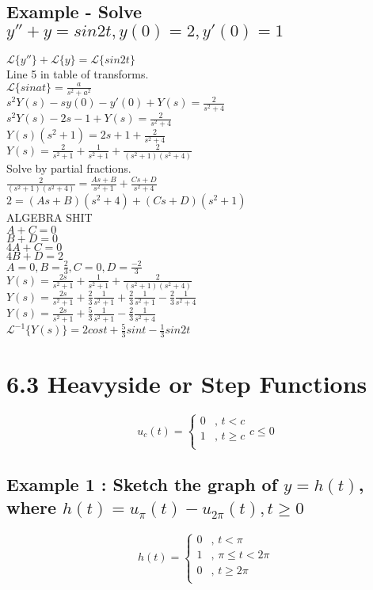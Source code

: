 \documentclass[12pt, letterpaper, twoside]{article}
\newcommand{\laplace}{\mathcal{L}}
\begin{document}
\subsection*{Example - Solve $y''+y=sin2t, y(0)=2, y'(0)=1$}
$\laplace\{y''\}+\laplace\{y\}=\laplace\{sin2t\}$\\
Line 5 in table of transforms.\\
$\laplace\{sinat\}=\frac{a}{s^2+a^2}$\\
$s^2Y(s)-sy(0)-y'(0)+Y(s)=\frac{2}{s^2+4}$\\
$s^2Y(s)-2s-1+Y(s)=\frac{2}{s^2+4}$\\
$Y(s)(s^2+1)=2s+1+\frac{2}{s^2+4}$\\
$Y(s)=\frac{2}{s^2+1}+\frac{1}{s^2+1}+\frac{2}{(s^2+1)(s^2+4)}$\\
Solve by partial fractions.\\
$\frac{2}{(s^2+1)(s^2+4)}=\frac{As+B}{s^2+1}+\frac{Cs+D}{s^2+4}$\\
$2=(As+B)(s^2+4)+(Cs+D)(s^2+1)$\\
ALGEBRA SHIT\\
$A+C=0$\\
$B+D=0$\\
$4A+C=0$\\
$4B+D=2$\\
$A=0, B=\frac{2}{3}, C=0, D=\frac{-2}{3}$\\
$Y(s)=\frac{2s}{s^2+1}+\frac{1}{s^2+1}+\frac{2}{(s^2+1)(s^2+4)}$\\
$Y(s)=\frac{2s}{s^2+1}+\frac{2}{3}\frac{1}{s^2+1}+\frac{2}{3}\frac{1}{s^2+1}-\frac{2}{3}\frac{1}{s^2+4}$\\
$Y(s)=\frac{2s}{s^2+1}+\frac{5}{3}\frac{1}{s^2+1}-\frac{2}{3}\frac{1}{s^2+4}$\\
$\laplace^{-1}\{Y(s)\}=2cost+\frac{5}{3}sint-\frac{1}{3}sin2t$\\

\section*{6.3 Heavyside or Step Functions}
\[
  u_c(t) =
  \begin{cases}
  	0 & \text{, $t < c$} \\
  	1 & \text{, $t \geq c$} \\
  \end{cases}
  c \leq 0
\]

\subsection*{Example 1 : Sketch the graph of $y=h(t)$, where $h(t)=u_\pi(t)-u_{2\pi}(t), t \geq 0$}
\[
  h(t) =
  \begin{cases}
  	0 & \text{, $t < \pi$} \\
  	1 & \text{, $\pi \leq t < 2\pi$} \\
  	0 & \text{, $t \geq 2\pi$} \\
  \end{cases}
\]
\end{document}
